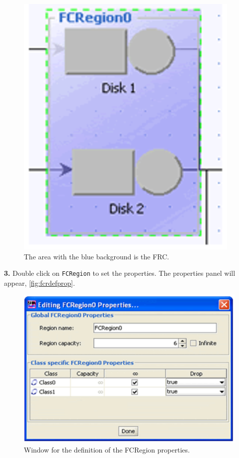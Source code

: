 \begin{figure}[h]
    \begin{center}
        \includegraphics[scale=.5]{img/jsimg/8.2.eps}
    \end{center}
    \caption{The area with the blue background is the FRC.}
    \label{fig:selfcrblueback}
\end{figure}
\textbf{3.}  Double click on \texttt{FCRegion} to set the
properties. The properties panel will appear,
\autoref{fig:fcrdefprop}.
\begin{figure}[h!]
    \begin{center}
        \includegraphics[scale=.5]{img/jsimg/8.3.eps}
    \end{center}
    \caption{Window for the definition of the FCRegion properties.}
    \label{fig:fcrdefprop}
\end{figure}


